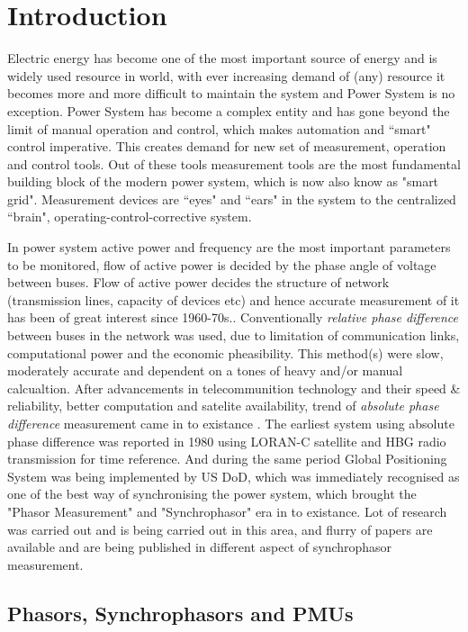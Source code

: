 \chapter{Introduction}
\setcounter{page}{1}

Electric energy has become one of the most important source of energy and is widely used resource in world, with ever increasing demand of (any) resource it becomes more and more difficult to maintain the system and Power System is no exception. Power System has become a complex entity and has gone beyond the limit of manual operation and control, which makes automation and ``smart" control imperative. This creates demand for new set of measurement, operation and control tools. Out of these tools measurement tools are the most fundamental building block of the modern power system, which is now also know as "smart grid". Measurement devices are ``eyes" and ``ears" in the system to the centralized ``brain", operating-control-corrective system.  

In power system active power and frequency are the most important parameters to be monitored, flow of active power is decided by the phase angle of voltage between buses. Flow of active power decides the structure of network (transmission lines, capacity of devices etc) and hence accurate measurement of it has been of great interest since 1960-70s.\cite{agphadkebook}. Conventionally \textit{relative phase difference} between buses in the network was used, due to limitation of communication links, computational power and the economic pheasibility. This method(s) were slow, moderately accurate and dependent on a tones of heavy and/or manual calcualtion. 
After advancements in telecommunition technology and their speed \& reliability, better computation and satelite availability, trend of \textit{absolute phase difference} measurement came in to existance \cite{PMUhist}. The earliest system using absolute phase difference was reported in 1980 using LORAN-C satellite and HBG radio transmission for time reference. And during the same period Global Positioning System was being implemented by US DoD, which was immediately recognised as one of the best way of synchronising the power system, which brought the "Phasor Measurement" and "Synchrophasor" era in to existance. Lot of research was carried out and is being carried out in this area, and flurry of papers are available and are being published in different aspect of synchrophasor measurement. 
\section{Phasors, Synchrophasors and PMUs}
